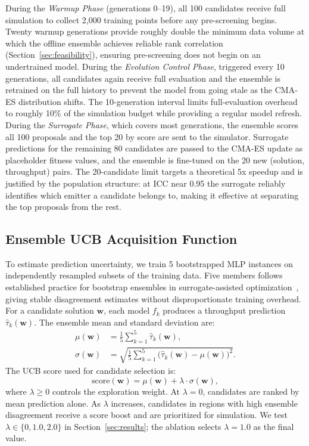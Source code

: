 \documentclass[conference]{IEEEtran}
\begin{document}
During the \emph{Warmup Phase} (generations 0--19), all 100 candidates
receive full simulation to collect 2,000 training points before any
pre-screening begins. Twenty warmup generations provide roughly double the
minimum data volume at which the offline ensemble achieves reliable rank
correlation (Section~\ref{sec:feasibility}), ensuring pre-screening does
not begin on an undertrained model.
During the \emph{Evolution Control Phase},
triggered every 10 generations, all candidates again receive full
evaluation and the ensemble is retrained on the full history to prevent
the model from going stale as the CMA-ES distribution shifts. The
10-generation interval limits full-evaluation overhead to roughly 10\%
of the simulation budget while providing a regular model refresh.
During the
\emph{Surrogate Phase}, which covers most generations, the ensemble
scores all 100 proposals and the top 20 by score are sent to the simulator.
Surrogate predictions for the remaining 80 candidates are passed to the
CMA-ES update as placeholder fitness values, and the ensemble is fine-tuned
on the 20 new (solution, throughput) pairs. The 20-candidate limit targets
a theoretical 5x speedup and is justified by the population structure: at
ICC near 0.95 the surrogate reliably identifies which emitter a candidate
belongs to, making it effective at separating the top proposals from the
rest.

\subsection{Ensemble UCB Acquisition Function}

To estimate prediction uncertainty, we train 5 bootstrapped MLP instances
on independently resampled subsets of the training data. Five members
follows established practice for bootstrap ensembles in surrogate-assisted
optimization~\cite{lakshminarayanan2017}, giving stable
disagreement estimates without disproportionate training overhead. For a candidate
solution $\mathbf{w}$, each model $f_k$ produces a throughput prediction
$\hat{\tau}_k(\mathbf{w})$. The ensemble mean and standard deviation are:
\begin{align}
  \mu(\mathbf{w}) &= \frac{1}{5} \sum_{k=1}^{5} \hat{\tau}_k(\mathbf{w}),
  \label{eq:mu} \\
  \sigma(\mathbf{w}) &= \sqrt{\frac{1}{5} \sum_{k=1}^{5}
    \bigl(\hat{\tau}_k(\mathbf{w}) - \mu(\mathbf{w})\bigr)^2}.
  \label{eq:sigma}
\end{align}
The UCB score used for candidate selection is:
\begin{equation}
  \text{score}(\mathbf{w}) = \mu(\mathbf{w}) + \lambda \cdot \sigma(\mathbf{w}),
  \label{eq:ucb}
\end{equation}
where $\lambda \geq 0$ controls the exploration weight. At $\lambda = 0$,
candidates are ranked by mean prediction alone. As $\lambda$ increases,
candidates in regions with high ensemble disagreement receive a score
boost and are prioritized for simulation. We test $\lambda \in
\{0, 1.0, 2.0\}$ in Section~\ref{sec:results}; the ablation selects
$\lambda = 1.0$ as the final value.
\end{document}
